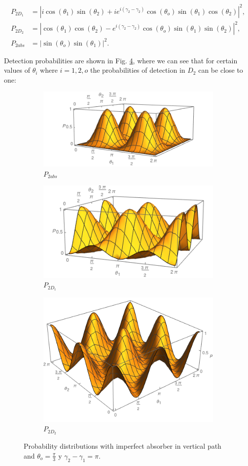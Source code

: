 \documentclass{book}
\begin{document}
\begin{align}
 P_{2D_{1}}&=|i\cos(\theta_{1})\sin(\theta_{2})+i e^{i(\gamma_{2}-\gamma_{2})}\cos(\theta_{o}) \sin(\theta_{1})\cos(\theta_{2})|^2,\\
 P_{2D_{2}}&=|\cos(\theta_{1})\cos(\theta_{2})- e^{i(\gamma_{2}-\gamma_{2})}\cos(\theta_{o}) \sin(\theta_{1})\sin(\theta_{2})|^2,\\
 P_{2abs}&=|\sin(\theta_{o}) \sin(\theta_{1})|^2.
\end{align}


Detection probabilities are shown in Fig. \ref{P_bs}, where we can see that for certain values of $\theta_{i}$ where $i=1,2,o$ the probabilities of detection in $D_{2}$ can be close to one:


\begin{figure}[H]
\centering
\begin{subfigure}[b]{0.45\linewidth}
\includegraphics[width=\linewidth,height=2.8 cm]{images/P1abs.png}
\caption{$P_{2abs}$}
\label{fig:BS2}
\end{subfigure}
\begin{subfigure}[b]{0.45\linewidth}
\includegraphics[width=\linewidth,height=2.8 cm]{images/P1d1.png}
\caption{$P_{2D_{1}}$}
\label{fig:westminster_aerea}
\end{subfigure}
\begin{subfigure}[b]{0.45\linewidth}
\includegraphics[width=\linewidth,height=2.8 cm]{images/P1d2.png}
\caption{$P_{2D_{2}}$}
\label{fig:BS2}
\end{subfigure}
\caption{Probability distributions with imperfect absorber in vertical path and $\theta_{o}=\frac{\pi}{3}$ y $\gamma_{2}-\gamma_{1}=\pi$.}
\label{P_bs}
\end{figure}
\end{document}
